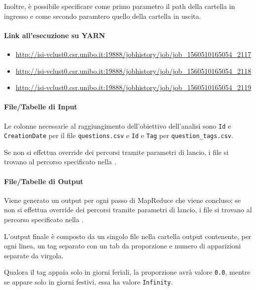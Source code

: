   Inoltre, è possibile specificare come primo parametro il path della cartella in ingresso e come secondo paramtero quello della cartella in uscita.

  \paragraph{Link all'esecuzione su YARN}\label{par:job1:mapreduce:yarn}

  \begin{itemize}
    \item \url{http://isi-vclust0.csr.unibo.it:19888/jobhistory/job/job_1560510165054_2117}
    \item \url{http://isi-vclust0.csr.unibo.it:19888/jobhistory/job/job_1560510165054_2118}
    \item \url{http://isi-vclust0.csr.unibo.it:19888/jobhistory/job/job_1560510165054_2119}
  \end{itemize}

  \paragraph{File/Tabelle di Input}\label{par:job1:mapreduce:input}

  Le colonne necessarie al raggiungimento dell'obiettivo dell'analisi sono \texttt{Id} e \texttt{CreationDate} per il file \texttt{questions.csv}
  e \texttt{Id} e \texttt{Tag} per \texttt{question\_tags.csv}.

  Se non si effettua override dei percorsi tramite parametri di lancio, i file si trovano al percorso specificato nella .

  \paragraph{File/Tabelle di Output}\label{par:job1:mapreduce:output}

  Viene generato un output per ogni passo di MapReduce che viene concluso;
  se non si effettua override dei percorsi tramite parametri di lancio, i file si trovano al percorso specificato nella .

  L'output finale è composto da un singolo file nella cartella output contenente, per ogni linea, un tag separato con un tab da proporzione e numero di apparizioni separate da virgola.

  Qualora il tag appaia solo in giorni feriali, la proporzione avrà valore \texttt{0.0}, mentre se appare solo in giorni festivi, essa ha valore \texttt{Infinity}.

